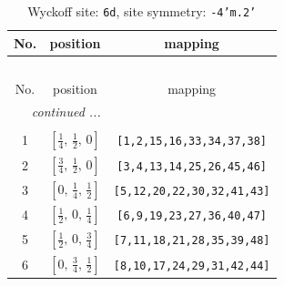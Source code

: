 \documentclass[fleqn,8pt]{jsarticle}
\begin{document}
\begin{longtable}{ccc}
\caption{Wyckoff site: {\tt 6d}, site symmetry: {\tt -4'm.2'}}
 \\
 \hline \hline
No. & position & mapping \\ \hline \endfirsthead

\multicolumn{2}{l}{\tablename\ \thetable{}} \\
 \hline \hline
No. & position & mapping \\ \hline \endhead

 \hline \hline
\multicolumn{2}{r}{\footnotesize\it continued ...} \\ \endfoot

 \hline \hline
\multicolumn{2}{r}{} \\ \endlastfoot

1 & $\left[ \frac{1}{4},\, \frac{1}{2},\, 0 \right]$ & {\tt [1,2,15,16,33,34,37,38]} \\ \hline
2 & $\left[ \frac{3}{4},\, \frac{1}{2},\, 0 \right]$ & {\tt [3,4,13,14,25,26,45,46]} \\ \hline
3 & $\left[ 0,\, \frac{1}{4},\, \frac{1}{2} \right]$ & {\tt [5,12,20,22,30,32,41,43]} \\ \hline
4 & $\left[ \frac{1}{2},\, 0,\, \frac{1}{4} \right]$ & {\tt [6,9,19,23,27,36,40,47]} \\ \hline
5 & $\left[ \frac{1}{2},\, 0,\, \frac{3}{4} \right]$ & {\tt [7,11,18,21,28,35,39,48]} \\ \hline
6 & $\left[ 0,\, \frac{3}{4},\, \frac{1}{2} \right]$ & {\tt [8,10,17,24,29,31,42,44]} \\
\end{longtable}
\renewcommand{\arraystretch}{1.2}
\end{document}
